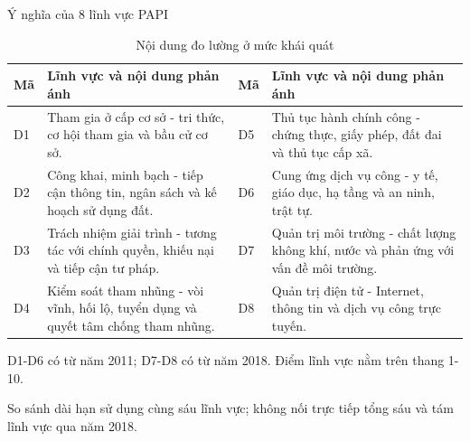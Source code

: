 \begin{frame}[t]{Ý nghĩa của 8 lĩnh vực PAPI}
  \begin{table}
    \centering
    \caption*{Nội dung đo lường ở mức khái quát}
    \scriptsize
    \setlength{\tabcolsep}{4pt}
    \renewcommand{\arraystretch}{1.22}
    \begin{tabularx}{\textwidth}{@{}p{}X p{}X@{}}
      \toprule
      \textbf{Mã} & \textbf{Lĩnh vực và nội dung phản ánh} & \textbf{Mã} & \textbf{Lĩnh vực và nội dung phản ánh} \\
      \midrule
      D1 & Tham gia ở cấp cơ sở - tri thức, cơ hội tham gia và bầu cử cơ sở. &
      D5 & Thủ tục hành chính công - chứng thực, giấy phép, đất đai và thủ tục cấp xã. \\
      D2 & Công khai, minh bạch - tiếp cận thông tin, ngân sách và kế hoạch sử dụng đất. &
      D6 & Cung ứng dịch vụ công - y tế, giáo dục, hạ tầng và an ninh, trật tự. \\
      D3 & Trách nhiệm giải trình - tương tác với chính quyền, khiếu nại và tiếp cận tư pháp. &
      D7 & Quản trị môi trường - chất lượng không khí, nước và phản ứng với vấn đề môi trường. \\
      D4 & Kiểm soát tham nhũng - vòi vĩnh, hối lộ, tuyển dụng và quyết tâm chống tham nhũng. &
      D8 & Quản trị điện tử - Internet, thông tin và dịch vụ công trực tuyến. \\
      \bottomrule
    \end{tabularx}
  \end{table}

  \vspace{0.1cm}
  \centering
  {\footnotesize D1-D6 có từ năm 2011; D7-D8 có từ năm 2018. Điểm lĩnh vực nằm trên thang 1-10.}\par
  {\scriptsize So sánh dài hạn sử dụng cùng sáu lĩnh vực; không nối trực tiếp tổng sáu và tám lĩnh vực qua năm 2018.}
\end{frame}

